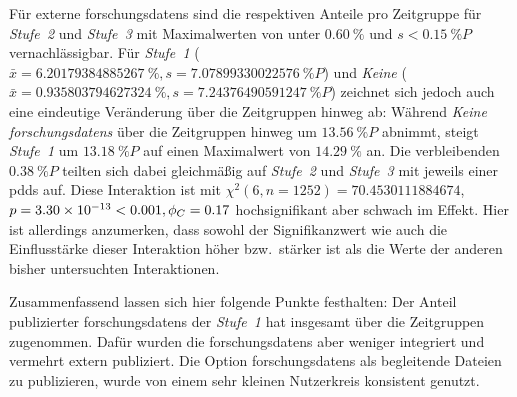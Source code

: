 Für externe \glspl{forschungsdaten} sind die respektiven Anteile pro Zeitgruppe für \textit{Stufe~2} und \textit{Stufe~3} mit Maximalwerten von unter $\SI{0,60}{\percent}$ und $s<\SI{0,15}{\percent P}$ vernachlässigbar.
Für \textit{Stufe~1} ($\bar{x}=\SI[round-mode=places,round-precision=2]{6.20179384885267}{\percent},s=\SI[round-mode=places,round-precision=2]{7.07899330022576}{\percent P}$) und \textit{Keine} ($\bar{x}=\SI[round-mode=places,round-precision=2]{0.935803794627324}{\percent},s=\SI[round-mode=places,round-precision=2]{7.24376490591247}{\percent P}$) zeichnet sich jedoch auch eine eindeutige Veränderung über die Zeitgruppen hinweg ab:
Während \textit{Keine \glspl{forschungsdaten}} über die Zeitgruppen hinweg um $\SI[round-mode=places,round-precision=2]{13.56}{\percent P}$ abnimmt, steigt \textit{Stufe~1} um $\SI[round-mode=places,round-precision=2]{13.18}{\percent P}$ auf einen Maximalwert von $\SI[round-mode=places,round-precision=2]{14.29}{\percent}$ an.
Die verbleibenden $\SI[round-mode=places,round-precision=2]{0.38}{\percent P}$ teilten sich dabei gleichmäßig auf \textit{Stufe~2} und \textit{Stufe~3} mit jeweils einer \glspl{pdd} auf.
Diese Interaktion ist mit $\chi^2 (\num{6}, n=\num{1252}) = \num[round-mode=places,round-precision=2]{70.4530111884674}$, $p = \num[round-mode=places,round-precision=2]{3.3012369430121E-13}<\num{0.001},\phi_C=\num[round-mode=places,round-precision=2]{0.167738446925158}$ hochsignifikant aber schwach im Effekt.
Hier ist allerdings anzumerken, dass sowohl der Signifikanzwert wie auch die Einflusstärke dieser Interaktion höher bzw.~stärker ist als die Werte der anderen bisher untersuchten Interaktionen.

Zusammenfassend lassen sich hier folgende Punkte festhalten:
Der Anteil publizierter \glspl{forschungsdaten} der \textit{Stufe~1} hat insgesamt über die Zeitgruppen zugenommen.
Dafür wurden die \glspl{forschungsdaten} aber weniger integriert und vermehrt extern publiziert.
Die Option \glspl{forschungsdaten} als begleitende Dateien zu publizieren, wurde von einem sehr kleinen Nutzerkreis konsistent genutzt.

